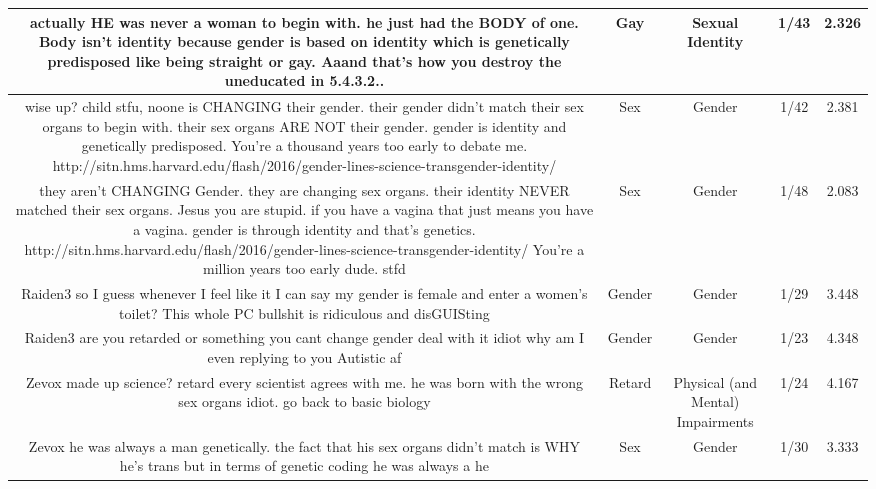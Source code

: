 \documentclass[11pt]{article}
\newlength\mylength
\begin{document}
\begin{center}
\begin{longtable}{|C{.40\mylength}|C{.30\mylength}|C{.15\mylength}|C{.15\mylength}|C{.15\mylength}|}
  actually HE was never a woman to begin with. he just had the BODY of one. Body isn't identity because gender is based on identity which is genetically predisposed like being straight or gay. Aaand that's how you destroy the uneducated in 5.4.3.2..  & Gay & Sexual Identity & 1/43 & 2.326 \\  \hline
  wise up? child stfu, noone is CHANGING their gender. their gender didn't match their sex organs to begin with. their sex organs ARE NOT their gender. gender is identity and genetically predisposed. You're a thousand years too early to debate me. http://sitn.hms.harvard.edu/flash/2016/gender-lines-science-transgender-identity/  & Sex & Gender & 1/42 & 2.381 \\  \hline
  they aren't CHANGING Gender. they are changing sex organs. their identity NEVER matched their sex organs. Jesus you are stupid. if you have a vagina that just means you have a vagina. gender is through identity and that's genetics. http://sitn.hms.harvard.edu/flash/2016/gender-lines-science-transgender-identity/  You're a million years too early dude. stfd  & Sex & Gender & 1/48 & 2.083 \\  \hline
  Raiden3 so I guess whenever I feel like it I can say  my gender is female  and enter a women's toilet? This whole PC bullshit is ridiculous and disGUISting  & Gender & Gender & 1/29 & 3.448 \\  \hline
  Raiden3 are you retarded or something you cant change gender deal with it idiot why am I even replying to you Autistic af  & Gender & Gender & 1/23 & 4.348 \\  \hline
  Zevox made up science?  retard every scientist agrees with me. he was born with the wrong sex organs idiot. go back to basic biology  & Retard & Physical (and Mental) Impairments & 1/24 & 4.167 \\  \hline
  Zevox he was always a man genetically.  the fact that his sex organs didn't match is WHY he's trans but in terms of genetic coding he was always a he  & Sex & Gender & 1/30 & 3.333 \\  \hline

\end{longtable}
\end{center}
\end{document}
